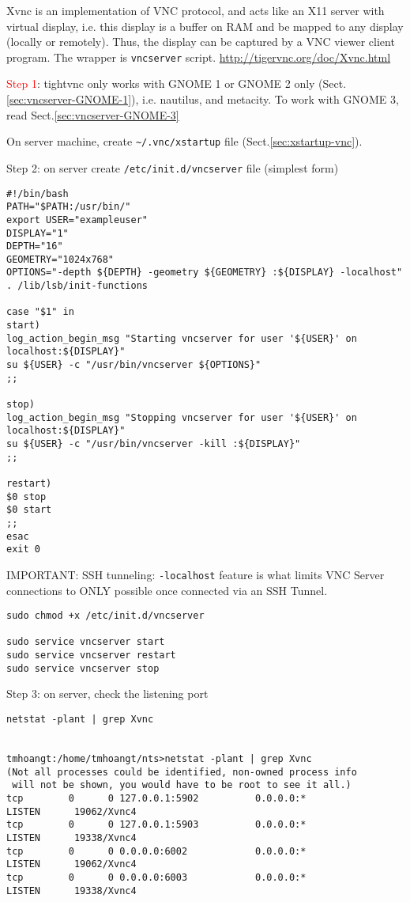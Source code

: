 Xvnc is an implementation of VNC protocol, and acts like an X11 server with
virtual display, i.e. this display is a buffer on RAM and be mapped to any
display (locally or remotely).
Thus, the display can be captured by a VNC viewer client program.
The wrapper is \verb!vncserver! script.
\url{http://tigervnc.org/doc/Xvnc.html}


\textcolor{red}{Step 1}: tightvnc only works with GNOME 1 or GNOME 2 only
(Sect.\ref{sec:vncserver-GNOME-1}), i.e. nautilus, and metacity. To work with
GNOME 3, read Sect.\ref{sec:vncserver-GNOME-3}

On server machine, create \verb!~/.vnc/xstartup! file
(Sect.\ref{sec:xstartup-vnc}).

Step 2: on server create \verb!/etc/init.d/vncserver! file
(simplest form)
\begin{verbatim}
#!/bin/bash
PATH="$PATH:/usr/bin/"
export USER="exampleuser"
DISPLAY="1"
DEPTH="16"
GEOMETRY="1024x768"
OPTIONS="-depth ${DEPTH} -geometry ${GEOMETRY} :${DISPLAY} -localhost"
. /lib/lsb/init-functions

case "$1" in
start)
log_action_begin_msg "Starting vncserver for user '${USER}' on localhost:${DISPLAY}"
su ${USER} -c "/usr/bin/vncserver ${OPTIONS}"
;;

stop)
log_action_begin_msg "Stopping vncserver for user '${USER}' on localhost:${DISPLAY}"
su ${USER} -c "/usr/bin/vncserver -kill :${DISPLAY}"
;;

restart)
$0 stop
$0 start
;;
esac
exit 0
\end{verbatim}

IMPORTANT: SSH tunneling: \verb!-localhost! feature is what limits VNC Server
connections to ONLY possible once connected via an SSH Tunnel.
\begin{verbatim}
sudo chmod +x /etc/init.d/vncserver

sudo service vncserver start
sudo service vncserver restart
sudo service vncserver stop
\end{verbatim}


Step 3: on server, check the listening port
\begin{verbatim}
netstat -plant | grep Xvnc


tmhoangt:/home/tmhoangt/nts>netstat -plant | grep Xvnc
(Not all processes could be identified, non-owned process info
 will not be shown, you would have to be root to see it all.)
tcp        0      0 127.0.0.1:5902          0.0.0.0:*               LISTEN      19062/Xvnc4     
tcp        0      0 127.0.0.1:5903          0.0.0.0:*               LISTEN      19338/Xvnc4     
tcp        0      0 0.0.0.0:6002            0.0.0.0:*               LISTEN      19062/Xvnc4     
tcp        0      0 0.0.0.0:6003            0.0.0.0:*               LISTEN      19338/Xvnc4 
\end{verbatim}

